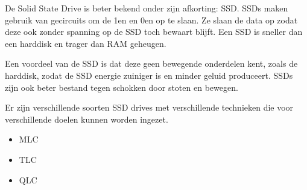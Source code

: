 De Solid State Drive is beter bekend onder zijn afkorting: SSD. SSDs maken gebruik van ge\integreerde circuits om de 1en en 0en op te slaan. Ze slaan de data op zodat deze ook zonder spanning op de SSD toch bewaart blijft. Een SSD is sneller dan een harddisk en trager dan RAM geheugen.

Een voordeel van de SSD is dat deze geen bewegende onderdelen kent, zoals de harddisk, zodat de SSD energie zuiniger is en minder geluid produceert. SSDs zijn ook beter bestand tegen schokken door stoten en bewegen.

Er zijn verschillende soorten SSD drives met verschillende technieken die voor verschillende doelen kunnen worden ingezet.
\begin{itemize}
\item MLC
\item TLC
\item QLC
\end{itemize}

